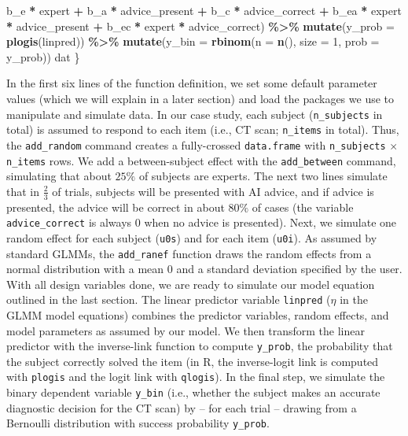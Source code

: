 \documentclass[
  man,floatsintext]{apa6}
\newenvironment{Shaded}{\begin{snugshade}}{\end{snugshade}}
\newcommand{\AttributeTok}[1]{\textcolor[rgb]{0.13,0.29,0.53}{#1}}
\newcommand{\DecValTok}[1]{\textcolor[rgb]{0.00,0.00,0.81}{#1}}
\newcommand{\FunctionTok}[1]{\textcolor[rgb]{0.13,0.29,0.53}{\textbf{#1}}}
\newcommand{\NormalTok}[1]{#1}
\newcommand{\SpecialCharTok}[1]{\textcolor[rgb]{0.81,0.36,0.00}{\textbf{#1}}}
\begin{document}
\begin{Shaded}
\begin{Highlighting}[]
\NormalTok{        b\_e }\SpecialCharTok{*}\NormalTok{ expert }\SpecialCharTok{+}\NormalTok{ b\_a }\SpecialCharTok{*}\NormalTok{ advice\_present }\SpecialCharTok{+}\NormalTok{ b\_c }\SpecialCharTok{*}\NormalTok{ advice\_correct }\SpecialCharTok{+}
\NormalTok{        b\_ea }\SpecialCharTok{*}\NormalTok{ expert }\SpecialCharTok{*}\NormalTok{ advice\_present }\SpecialCharTok{+}\NormalTok{ b\_ec }\SpecialCharTok{*}\NormalTok{ expert }\SpecialCharTok{*}\NormalTok{ advice\_correct) }\SpecialCharTok{\%\textgreater{}\%}
    \FunctionTok{mutate}\NormalTok{(}\AttributeTok{y\_prob =} \FunctionTok{plogis}\NormalTok{(linpred)) }\SpecialCharTok{\%\textgreater{}\%}
    \FunctionTok{mutate}\NormalTok{(}\AttributeTok{y\_bin =} \FunctionTok{rbinom}\NormalTok{(}\AttributeTok{n =} \FunctionTok{n}\NormalTok{(), }\AttributeTok{size =} \DecValTok{1}\NormalTok{, }\AttributeTok{prob =}\NormalTok{ y\_prob))}
\NormalTok{  dat}
\NormalTok{\}}
\end{Highlighting}
\end{Shaded}

In the first six lines of the function definition, we set some default parameter values (which we will explain in a later section) and load the packages we use to manipulate and simulate data.
In our case study, each subject (\texttt{n\_subjects} in total) is assumed to respond to each item (i.e., CT scan; \texttt{n\_items} in total). Thus, the \texttt{add\_random} command creates a fully-crossed \texttt{data.frame} with \texttt{n\_subjects} \(\times\) \texttt{n\_items} rows. We add a between-subject effect with the \texttt{add\_between} command, simulating that about \(25\%\) of subjects are experts. The next two lines simulate that in \(\frac{2}{3}\) of trials, subjects will be presented with AI advice, and if advice is presented, the advice will be correct in about \(80\%\) of cases (the variable \texttt{advice\_correct} is always 0 when no advice is presented). Next, we simulate one random effect for each subject (\texttt{u0s}) and for each item (\texttt{u0i}). As assumed by standard GLMMs, the \texttt{add\_ranef} function draws the random effects from a normal distribution with a mean 0 and a standard deviation specified by the user. With all design variables done, we are ready to simulate our model equation outlined in the last section. The linear predictor variable \texttt{linpred} (\(\eta\) in the GLMM model equations) combines the predictor variables, random effects, and model parameters as assumed by our model. We then transform the linear predictor with the inverse-link function to compute \texttt{y\_prob}, the probability that the subject correctly solved the item (in R, the inverse-logit link is computed with \texttt{plogis} and the logit link with \texttt{qlogis}). In the final step, we simulate the binary dependent variable \texttt{y\_bin} (i.e., whether the subject makes an accurate diagnostic decision for the CT scan) by -- for each trial -- drawing from a Bernoulli distribution with success probability \texttt{y\_prob}.
\end{document}
